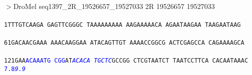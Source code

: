 \documentclass[11pt,twoside,reqno,a4paper]{article}
\begin{document}
\\
$>$DroMel	seq1397\_2R\_19526657\_19527033	2R	19526657	19527033 \\
 \\
\texttt{1\hspace*{3\charwidth}TTTGTCAAGA	GAGTTCGGGC	TAAAAAAAAA	AAGAAAAACA	AGAATAAGAA	TAAGAATAAG	\\
\hspace*{4\charwidth}\hspace*{1\charwidth}\hspace*{1\charwidth}\hspace*{1\charwidth}\hspace*{1\charwidth}\hspace*{1\charwidth}\hspace*{1\charwidth}\\
61\hspace*{2\charwidth}GACAACGAAA	AAACAAGGAA	ATACAGTTGT	AAAACCGGCG	ACTCGAGCCA	CAGAAAAGCA	\\
\hspace*{4\charwidth}\hspace*{1\charwidth}\hspace*{1\charwidth}\hspace*{1\charwidth}\hspace*{1\charwidth}\hspace*{1\charwidth}\hspace*{1\charwidth}\\
121\hspace*{1\charwidth}GAA\textcolor{Blue}{A}\textcolor{Blue}{C}\textcolor{Blue}{A}\textcolor{Blue}{A}\textcolor{Blue}{A}\textcolor{Blue}{T}\textcolor{Blue}{G}	\textcolor{Blue}{C}\textcolor{Blue}{G}\textcolor{Blue}{G}AT\textit{\textcolor{Blue}{A}}\textit{\textcolor{Blue}{C}}\textit{\textcolor{Blue}{A}}\textit{\textcolor{Blue}{C}}\textit{\textcolor{Blue}{A}}	\textit{\textcolor{Blue}{T}}\textit{\textcolor{Blue}{G}}\textit{\textcolor{Blue}{C}}\textit{\textcolor{Blue}{T}}\textit{\textcolor{Blue}{C}}GCCGG	CTCGTAATCT	TAATCCTTCA	CACAATAAAC	\\
\hspace*{4\charwidth}\hspace*{3\charwidth}\textcolor{Blue}{7.8}\hspace*{1\charwidth}\hspace*{9\charwidth}\textit{\textcolor{Blue}{9.9}}\hspace*{1\charwidth}\hspace*{1\charwidth}\hspace*{1\charwidth}\hspace*{1\charwidth}\hspace*{1\charwidth}\\
}
\end{document}
